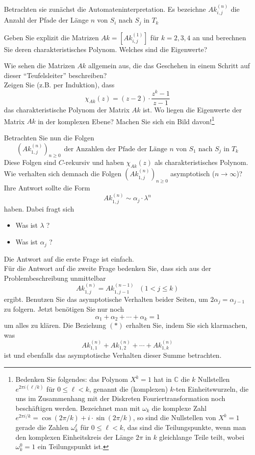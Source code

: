 Betrachten sie zunächst die Automateninterpretation. Es bezeichne
$Ak_{i,j}^{(n)}$ die Anzahl der Pfade der Länge $n$ von $S_i$ nach $S_j$ in
$T_k$

\begin{flushenum}
\item Geben Sie explizit die Matrizen $Ak = \left[ Ak_{i,j}^{(1)} \right]$ für
	$k=2,3,4$ an und berechnen Sie deren charakteristisches Polynom.
	Welches sind die Eigenwerte?
\item Wie sehen die Matrizen $Ak$ allgemein aus, die das Geschehen in einem
	Schritt auf dieser ``Teufelsleiter'' beschreiben?\\ Zeigen Sie (z.B.
	per Induktion), dass
	\[
	\chi_{Ak}(z) = (z-2) \cdot \frac{z^k-1}{z-1}
	\]
	das charakteristische Polynom der Matrix $Ak$ ist.  Wo liegen die
	Eigenwerte der Matrix $Ak$ in der komplexen Ebene?  Machen Sie sich ein
	Bild davon!\footnote{ Bedenken Sie folgendes: das Polynom $X^k=1$ hat
	in $\mathbb{C}$ die $k$ Nullstellen $e^{2 \pi i (\ell/k)}$ für $0 \leq
	\ell < k$, genannt die (komplexen) $k$-ten Einheitswurzeln, die uns im
	Zusammenhang mit der Diskreten Fouriertransformation noch beschäftigen
	werden. Bezeichnet man mit $\omega_k$ die komplexe Zahl $e^{2 \pi i
	/k}= \cos (2 \pi/k) + i \cdot \sin(2 \pi/k)$, so sind die Nullstellen
	von $X^k=1$ gerade die Zahlen $\omega_k^\ell$ für $0 \leq \ell < k$,
	das sind die Teilungspunkte, wenn man den komplexen Einheitskreis der
	Länge $2 \pi$ in $k$ gleichlange Teile teilt, wobei $\omega_k^0=1$ ein
	Teilungspunkt ist.}
\item Betrachten Sie nun die Folgen
	\[
	\left(Ak_{1,j}^{(n)}\right)_{n \geq 0}~~\text{der Anzahlen der Pfade 
	der Länge $n$ von $S_1$ nach $S_j$ in $T_k$}
	\]
	Diese Folgen sind $C$-rekursiv und haben $\chi_{Ak}(z)$ als
	charakteristisches Polynom. \\
	Wie verhalten sich demnach die Folgen $\left(Ak_{1,j}^{(n)}\right)_{n \geq 0}$ asymptotisch 
	($n \rightarrow \infty$)? Ihre Antwort sollte die Form
	\[
	Ak_{1,j}^{(n)} \sim  \alpha_j \cdot \lambda^n
	\]
	haben. Dabei fragt sich
	\begin{itemize}
	\item Was ist $\lambda$ ? 
	\item Was ist $\alpha_j$ ?
	\end{itemize}
	Die Antwort auf die erste Frage ist einfach. \\
	Für die Antwort auf die zweite Frage bedenken Sie, dass sich aus der
	Problembeschreibung unmittelbar
	\[
	Ak_{1,j}^{(n)} = Ak_{1,j-1}^{(n-1)} ~~~(1<j\leq k)
	\]
	ergibt. Benutzen Sie das asymptotische Verhalten beider Seiten, um $2
	\alpha_j= \alpha_{j-1}$ zu folgern.  Jetzt benötigen Sie nur noch
	\begin{equation*}
		\tag{$*$} \alpha_1+\alpha_2 + \cdots + \alpha_k=1
	\end{equation*}
	um alles zu klären. Die Beziehung $(*)$ erhalten Sie, indem Sie sich
	klarmachen, was
	\[
	Ak_{1,1}^{(n)} + Ak_{1,2}^{(n)} + \cdots + Ak_{1,k}^{(n)} 
	\]
	ist und ebenfalls das asymptotische Verhalten dieser Summe betrachten.
\end{flushenum}

